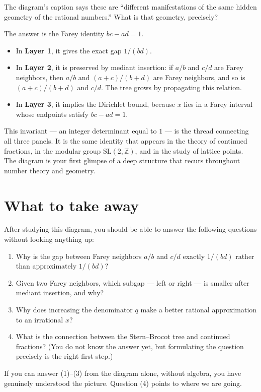 The diagram's caption says these are ``different manifestations of the
same hidden geometry of the rational numbers.''
What is that geometry, precisely?

\medskip

The answer is the Farey identity $bc - ad = 1$.
\begin{itemize}
  \item In \textbf{Layer 1}, it gives the exact gap $1/(bd)$.
  \item In \textbf{Layer 2}, it is preserved by mediant insertion:
        if $a/b$ and $c/d$ are Farey neighbors, then $a/b$ and
        $(a+c)/(b+d)$ are Farey neighbors, and so is
        $(a+c)/(b+d)$ and $c/d$.
        The tree grows by propagating this relation.
  \item In \textbf{Layer 3}, it implies the Dirichlet bound, because
        $x$ lies in a Farey interval whose endpoints satisfy
        $bc - ad = 1$.
\end{itemize}

\medskip

This invariant --- an integer determinant equal to $1$ --- is the
thread connecting all three panels.
It is the same identity that appears in the theory of continued
fractions, in the modular group $\mathrm{SL}(2,\mathbb{Z})$, and in
the study of lattice points.
The diagram is your first glimpse of a deep structure that recurs
throughout number theory and geometry.

\bigskip

\section*{What to take away}

After studying this diagram, you should be able to answer the
following questions without looking anything up:

\begin{enumerate}
  \item Why is the gap between Farey neighbors $a/b$ and $c/d$
        exactly $1/(bd)$ rather than approximately $1/(bd)$?
  \item Given two Farey neighbors, which subgap --- left or right ---
        is smaller after mediant insertion, and why?
  \item Why does increasing the denominator $q$ make a better
        rational approximation to an irrational $x$?
  \item What is the connection between the Stern--Brocot tree and
        continued fractions?
        (You do not know the answer yet, but formulating the question
        precisely is the right first step.)
\end{enumerate}

\noindent
If you can answer (1)--(3) from the diagram alone, without algebra,
you have genuinely understood the picture.
Question (4) points to where we are going.










